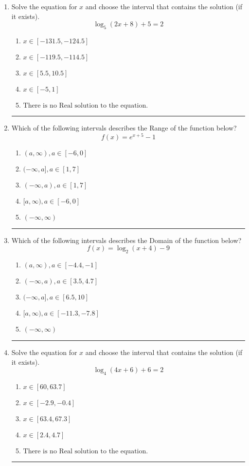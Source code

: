 \documentclass[14pt]{extbook}
\newcommand{\litem}[1]{\item#1\hspace*{-1cm}\rule{\textwidth}{0.4pt}}
\begin{document}
\begin{enumerate}
{\begin{enumerate}[label=\Alph*.]
\end{enumerate} }
\litem{
Solve the equation for $x$ and choose the interval that contains the solution (if it exists).\[ \log_{5}{(2x+8)}+5 = 2 \]\begin{enumerate}[label=\Alph*.]
\item \( x \in [-131.5, -124.5] \)
\item \( x \in [-119.5, -114.5] \)
\item \( x \in [5.5, 10.5] \)
\item \( x \in [-5, 1] \)
\item \( \text{There is no Real solution to the equation.} \)

\end{enumerate} }
\litem{
Which of the following intervals describes the Range of the function below?\[ f(x) = e^{x+5}-1 \]\begin{enumerate}[label=\Alph*.]
\item \( (a, \infty), a \in [-6, 0] \)
\item \( (-\infty, a], a \in [1, 7] \)
\item \( (-\infty, a), a \in [1, 7] \)
\item \( [a, \infty), a \in [-6, 0] \)
\item \( (-\infty, \infty) \)

\end{enumerate} }
\litem{
Which of the following intervals describes the Domain of the function below?\[ f(x) = \log_2{(x+4)}-9 \]\begin{enumerate}[label=\Alph*.]
\item \( (a, \infty), a \in [-4.4, -1] \)
\item \( (-\infty, a), a \in [3.5, 4.7] \)
\item \( (-\infty, a], a \in [6.5, 10] \)
\item \( [a, \infty), a \in [-11.3, -7.8] \)
\item \( (-\infty, \infty) \)

\end{enumerate} }
\litem{
Solve the equation for $x$ and choose the interval that contains the solution (if it exists).\[ \log_{4}{(4x+6)}+6 = 2 \]\begin{enumerate}[label=\Alph*.]
\item \( x \in [60, 63.7] \)
\item \( x \in [-2.9, -0.4] \)
\item \( x \in [63.4, 67.3] \)
\item \( x \in [2.4, 4.7] \)
\item \( \text{There is no Real solution to the equation.} \)


\end{enumerate}}
\end{enumerate}
\end{document}
